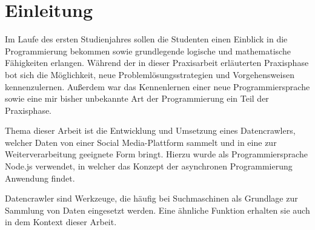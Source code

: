 
\chapter{Einleitung}
Im Laufe des ersten Studienjahres sollen die Studenten einen Einblick in die Programmierung bekommen sowie grundlegende logische und mathematische Fähigkeiten erlangen. Während der in dieser Praxisarbeit erläuterten Praxisphase bot sich die Möglichkeit, neue Problemlösungsstrategien und Vorgehensweisen kennenzulernen. Außerdem war das Kennenlernen einer neue Programmiersprache sowie eine mir bisher unbekannte Art der Programmierung ein Teil der Praxisphase.

Thema dieser Arbeit ist die Entwicklung und Umsetzung eines Datencrawlers, welcher Daten von einer Social Media-Plattform sammelt und in eine zur Weiterverarbeitung geeignete Form bringt. Hierzu wurde als Programmiersprache Node.js verwendet, in welcher das Konzept der asynchronen Programmierung Anwendung findet. 

Datencrawler sind Werkzeuge, die häufig bei Suchmaschinen als Grundlage zur Sammlung von Daten eingesetzt werden. Eine ähnliche Funktion erhalten sie auch in dem Kontext dieser Arbeit.


